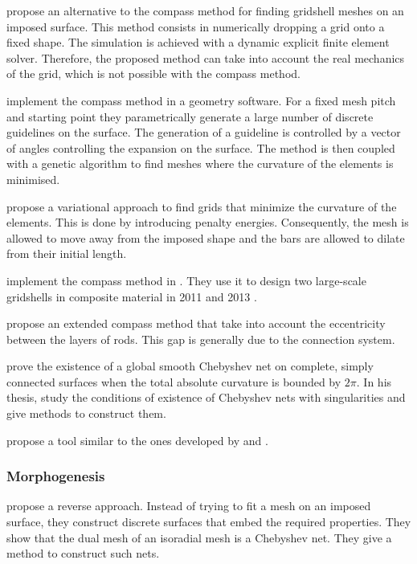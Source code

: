  propose an alternative to the compass method for finding gridshell meshes on an imposed surface. This method consists in numerically dropping a grid onto a fixed shape. The simulation is achieved with a dynamic explicit finite element solver. Therefore, the proposed method can take into account the real mechanics of the grid, which is not possible with the compass method.

 implement the compass method in a geometry software. For a fixed mesh pitch and starting point they parametrically generate a large number of discrete guidelines on the surface. The generation of a guideline is controlled by a vector of angles controlling the expansion on the surface. The method is then coupled with a genetic algorithm to find meshes where the curvature of the elements is minimised.

 propose a variational approach to find grids that minimize the curvature of the elements. This is done by introducing penalty energies. Consequently, the mesh is allowed to move away from the imposed shape and the bars are allowed to dilate from their initial length.

 implement the compass method in \grasshopper{}. They use it to design two large-scale gridshells in composite material in 2011 \cite{Baverel2012} and 2013 \Cite{DuPeloux2016}.

 propose an extended compass method that take into account the eccentricity between the layers of rods. This gap is generally due to the connection system.

 prove the existence of a global smooth Chebyshev net on complete, simply connected surfaces when the total absolute curvature is bounded by $2\pi$. In his thesis,  study the conditions of existence of Chebyshev nets with singularities and give methods to construct them.

 propose a tool similar to the ones developed by  and .

\subsubsection{Morphogenesis}

 propose a reverse approach. Instead of trying to fit a mesh on an imposed surface, they construct discrete surfaces that embed the required properties. They show that the dual mesh of an isoradial mesh is a Chebyshev net. They give a method to construct such nets.

